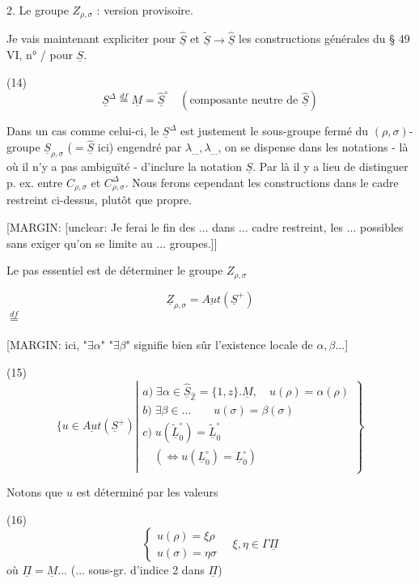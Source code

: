 2. Le groupe $Z_{\rho, \sigma}$ : version provisoire.

Je vais maintenant expliciter pour $\hat{\underline{S}}$ et $\tilde{\underline{S}} \to \hat{\underline{S}}$ les constructions générales du § 49 VI, n° / pour $\underline{S}$.

(14)
$$ \underline{S}^\Delta \overset{df}{=} \underline{M} = \hat{\underline{S}}^\circ \quad (\text{composante neutre de } \hat{\underline{S}})$$

Dans un cas comme celui-ci, le $\underline{S}^\Delta$ est justement le sous-groupe fermé du $(\rho, \sigma)$-groupe $\underline{S}_{\rho, \sigma}$ ($= \hat{\underline{S}}$ ici) engendré par $\lambda_{\dots}, \lambda_{\dots}$, on se dispense dans les notations - là où il n'y a pas ambiguïté - d'inclure la notation $\underline{S}$. Par là il y a lieu de distinguer p. ex. entre $C_{\rho, \sigma}$ et $C_{\rho, \sigma}^\Delta$. Nous ferons cependant les constructions dans le cadre restreint ci-dessus, plutôt que propre.

[MARGIN: [unclear: Je ferai le fin des $\dots$ dans $\dots$ cadre restreint, les $\dots$ possibles sans exiger qu'on se limite au $\dots$ groupes.]]

Le pas essentiel est de déterminer le groupe $Z_{\rho, \sigma}$

$$ \underline{Z}_{\rho, \sigma} = \underline{Aut}(\underline{S}^+) $$
$\overset{df}{=}$

[MARGIN: ici, "$\exists \alpha$" "$\exists \beta$" signifie bien sûr l'existence locale de $\alpha,\beta$...]

(15)
$$ \{ u \in \underline{Aut}(\underline{S}^+) \left| \begin{array}{l} a) \; \exists \alpha \in \hat{\underline{S}}_{\hat{\mathbb{Z}}} = \{1, z\}.\underline{M}, \quad u(\rho) = \alpha(\rho) \\ b) \; \exists \beta \in \dots \quad \quad u(\sigma) = \beta(\sigma) \\ c) \; u(\tilde{\underline{L}}_0^\circ) = \tilde{\underline{L}}_0^\circ \\ \quad (\iff u(\underline{L}_0^\circ) = \underline{L}_0^\circ) \\ [ d) \; (\text{automatique}) \quad u(\underline{S}^\Delta) \subset \underline{S}^\Delta ] \end{array} \right\} $$

Notons que $u$ est déterminé par les valeurs

(16)
$$ \begin{cases} u(\rho) = \xi \rho \\ u(\sigma) = \eta \sigma \end{cases} \quad \xi, \eta \in \Gamma \underline{\Pi} $$
où $\underline{\Pi} = \underline{M} \dots$
($\dots$ sous-gr. d'indice 2 dans $\underline{\Pi}$)

